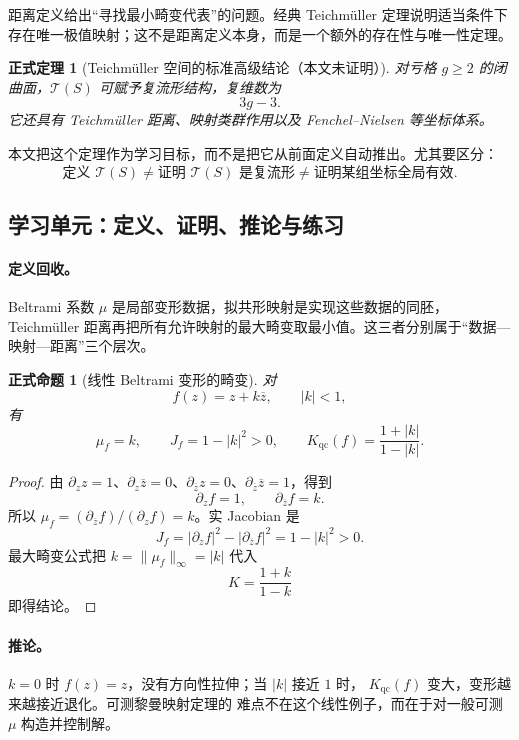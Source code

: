 \documentclass[UTF8,fontset=none,a4paper,11pt]{ctexart}
\theoremstyle{foundation-definition}
\theoremstyle{foundation-theorem}
\newtheorem{theorem}[definition]{正式定理}
\theoremstyle{foundation-proposition}
\newtheorem{proposition}[definition]{正式命题}
\theoremstyle{foundation-example}
\theoremstyle{foundation-remark}
\theoremstyle{foundation-theorem}
\newcommand{\T}{\mathcal T}
\begin{document}
距离定义给出“寻找最小畸变代表”的问题。经典 Teichmüller 定理说明适当条件下存在唯一极值映射；这不是距离定义本身，而是一个额外的存在性与唯一性定理。

\begin{theorem}[Teichmüller 空间的标准高级结论（本文未证明）]
对亏格 \(g\geq2\) 的闭曲面，\(\T(S)\) 可赋予复流形结构，复维数为
\[
3g-3.
\]
它还具有 Teichmüller 距离、映射类群作用以及 Fenchel--Nielsen 等坐标体系。
\end{theorem}

本文把这个定理作为学习目标，而不是把它从前面定义自动推出。尤其要区分：
\[
\text{定义 }\T(S)
\neq
\text{证明 }\T(S)\text{ 是复流形}
\neq
\text{证明某组坐标全局有效}.
\]

\subsection{学习单元：定义、证明、推论与练习}

\paragraph{定义回收。}
Beltrami 系数 \(\mu\) 是局部变形数据，拟共形映射是实现这些数据的同胚，Teichmüller 距离再把所有允许映射的最大畸变取最小值。这三者分别属于“数据—映射—距离”三个层次。

\begin{proposition}[线性 Beltrami 变形的畸变]\label{prop:linear-beltrami}
对
\[
f(z)=z+k\overline z,\qquad |k|<1,
\]
有
\[
\mu_f=k,\qquad J_f=1-|k|^2>0,\qquad
K_{\mathrm{qc}}(f)=\frac{1+|k|}{1-|k|}.
\]
\end{proposition}

\begin{proof}
由 \(\partial_z z=1\)、\(\partial_z\overline z=0\)、\(\partial_{\overline z}z=0\)、\(\partial_{\overline z}\overline z=1\)，得到
\[
\partial_zf=1,\qquad \partial_{\overline z}f=k.
\]
所以 \(\mu_f=(\partial_{\overline z}f)/(\partial_zf)=k\)。实 Jacobian 是
\[
J_f=|\partial_zf|^2-|\partial_{\overline z}f|^2=1-|k|^2>0.
\]
最大畸变公式把 \(k=\|\mu_f\|_\infty=|k|\) 代入
\[
K=\frac{1+k}{1-k}
\]
即得结论。
\end{proof}

\paragraph{推论。}
\(k=0\) 时 \(f(z)=z\)，没有方向性拉伸；当 \(|k|\) 接近 \(1\) 时，
\(K_{\mathrm{qc}}(f)\) 变大，变形越来越接近退化。可测黎曼映射定理的
难点不在这个线性例子，而在于对一般可测 \(\mu\) 构造并控制解。
\end{document}
